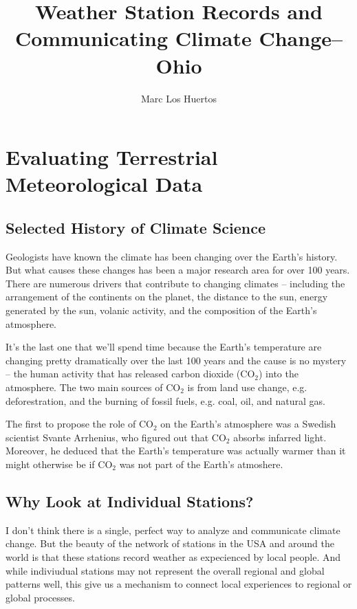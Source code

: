 \documentclass{article}\usepackage[]{graphicx}\usepackage[]{color}
\title{Weather Station Records and Communicating Climate Change--Ohio}
\author{Marc Los Huertos}
\begin{document}
\maketitle

\tableofcontents

\section{Evaluating Terrestrial Meteorological Data}

\subsection{Selected History of Climate Science}

Geologists have known the climate has been changing over the Earth's history. But what causes these changes has been a major research area for over 100 years. There are numerous drivers that contribute to changing climates -- including the arrangement of the continents on the planet, the distance to the sun, energy generated by the sun, volanic activity, and the composition of the Earth's atmosphere. 

It's the last one that we'll spend time because the Earth's temperature are changing pretty dramatically over the last 100 years and the cause is no mystery -- the human activity that has released carbon dioxide (CO$_2$) into the atmosphere. The two main sources of CO$_2$ is from land use change, e.g. deforestration, and the burning of fossil fuels, e.g. coal, oil, and natural gas. 

The first to propose the role of CO$_2$ on the Earth's atmosphere was a Swedish scientist Svante Arrhenius, who figured out that CO$_2$ absorbs infarred light. Moreover, he deduced that the Earth's temperature was actually warmer than it might otherwise be if CO$_2$ was not part of the Earth's atmoshere. 

\subsection{Why Look at Individual Stations?}

I don't think there is a single, perfect way to analyze and communicate climate change. But the beauty of the network of stations in the USA and around the world is that these stations record weather as expecienced by local people. And while indiviudual stations may not represent the overall regional and global patterns well, this give us a mechanism to connect local experiences to regional or global processes. 
\end{document}
